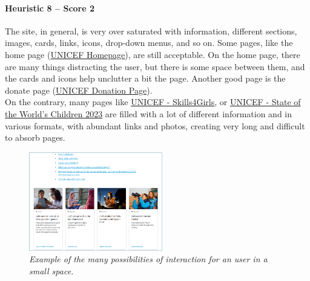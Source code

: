 \paragraph*{Heuristic 8 – Score 2}
The site, in general, is very over saturated with information, different sections, images, cards, links, icons, drop-down menus, and so on. Some pages, like the home page (\href{https://www.unicef.org/}{UNICEF Homepage}), are still acceptable. On the home page, there are many things distracting the user, but there is some space between them, and the cards and icons help unclutter a bit the page. Another good page is the donate page (\href{https://donazioni.unicef.it/}{UNICEF Donation Page}).\\
On the contrary, many pages like \href{https://www.unicef.org/gender-equality/skills4girls}{UNICEF - Skills4Girls}, or \href{https://www.unicef.org/reports/state-worlds-children-2023#SOWC}{UNICEF - State of the World's Children 2023} are filled with a lot of different information and in various formats, with abundant links and photos, creating very long and difficult to absorb pages.
\begin{figure}[h]
	\centering
	\begin{center}
		\includegraphics[width=0.52\textwidth]{Picture12.png}
	\end{center}
	\captionsetup{font=small}
	\caption{\textit{Example of the many possibilities of interaction for an user in a small space.}}
	\label{fig:label12}
\end{figure}

